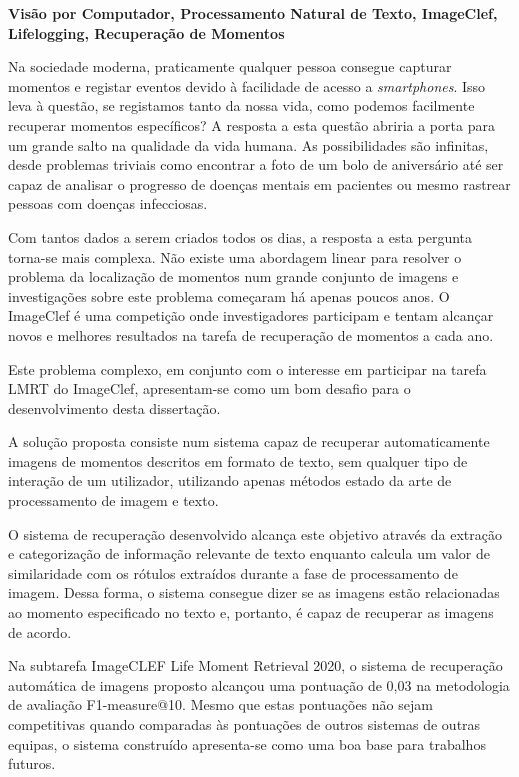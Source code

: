 \TitlePage
  \vspace*{55mm}
       {\textbf{Visão por Computador, Processamento Natural de Texto, ImageClef, Lifelogging, Recuperação de Momentos}}

          
      {Na sociedade moderna, praticamente qualquer pessoa consegue capturar momentos e registar eventos devido à facilidade de acesso a \textit{smartphones}. Isso leva à questão, se registamos tanto da nossa vida, como podemos facilmente recuperar momentos específicos? A resposta a esta questão abriria a porta para um grande salto na qualidade da vida humana. As possibilidades são infinitas, desde problemas triviais como encontrar a foto de um bolo de aniversário até ser capaz de analisar o progresso de doenças mentais em pacientes ou mesmo rastrear pessoas com doenças infecciosas.}

     \TEXT{}
     {Com tantos dados a serem criados todos os dias, a resposta a esta pergunta torna-se mais complexa. Não existe uma abordagem linear para resolver o problema da localização de momentos num grande conjunto de imagens e investigações sobre este problema começaram há apenas poucos anos. O ImageClef é uma competição onde investigadores participam e tentam alcançar novos e melhores resultados na tarefa de recuperação de momentos a cada ano.}

     \TEXT{}
     {Este problema complexo, em conjunto com o interesse em participar na tarefa LMRT do ImageClef, apresentam-se como um bom desafio para o desenvolvimento desta dissertação.}

     \TEXT{}
     {A solução proposta consiste num sistema capaz de recuperar automaticamente imagens de momentos descritos em formato de texto, sem qualquer tipo de interação de um utilizador, utilizando apenas métodos estado da arte de processamento de imagem e texto.} 

     \TEXT{}
     {O sistema de recuperação desenvolvido alcança este objetivo através da extração e categorização de informação relevante de texto enquanto calcula um valor de similaridade com os rótulos extraídos durante a fase de processamento de imagem. Dessa forma, o sistema consegue dizer se as imagens estão relacionadas ao momento especificado no texto e, portanto, é capaz de recuperar as imagens de acordo.
     }

     \TEXT{}
     {Na subtarefa ImageCLEF Life Moment Retrieval 2020, o sistema de recuperação automática de imagens proposto alcançou uma pontuação de 0,03 na metodologia de avaliação F1-measure@10. Mesmo que estas pontuações não sejam competitivas quando comparadas às pontuações de outros sistemas de outras equipas, o sistema construído apresenta-se como uma boa base para trabalhos futuros.}


